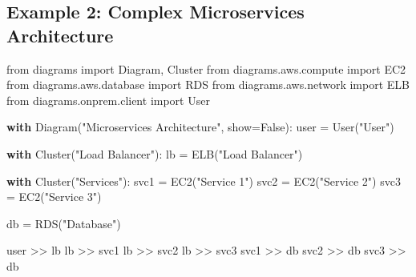 \documentclass[
  letterpaper,
  DIV=11,
  numbers=noendperiod]{scrreprt}
\newenvironment{Shaded}{\begin{snugshade}}{\end{snugshade}}
\newcommand{\ControlFlowTok}[1]{\textcolor[rgb]{0.00,0.23,0.31}{\textbf{#1}}}
\newcommand{\ImportTok}[1]{\textcolor[rgb]{0.00,0.46,0.62}{#1}}
\newcommand{\NormalTok}[1]{\textcolor[rgb]{0.00,0.23,0.31}{#1}}
\newcommand{\OperatorTok}[1]{\textcolor[rgb]{0.37,0.37,0.37}{#1}}
\newcommand{\StringTok}[1]{\textcolor[rgb]{0.13,0.47,0.30}{#1}}
\newcommand{\VariableTok}[1]{\textcolor[rgb]{0.07,0.07,0.07}{#1}}
\begin{document}
\subsection{Example 2: Complex Microservices
Architecture}\label{example-2-complex-microservices-architecture}

\begin{Shaded}
\begin{Highlighting}[]
\ImportTok{from}\NormalTok{ diagrams }\ImportTok{import}\NormalTok{ Diagram, Cluster}
\ImportTok{from}\NormalTok{ diagrams.aws.compute }\ImportTok{import}\NormalTok{ EC2}
\ImportTok{from}\NormalTok{ diagrams.aws.database }\ImportTok{import}\NormalTok{ RDS}
\ImportTok{from}\NormalTok{ diagrams.aws.network }\ImportTok{import}\NormalTok{ ELB}
\ImportTok{from}\NormalTok{ diagrams.onprem.client }\ImportTok{import}\NormalTok{ User}

\ControlFlowTok{with}\NormalTok{ Diagram(}\StringTok{"Microservices Architecture"}\NormalTok{, show}\OperatorTok{=}\VariableTok{False}\NormalTok{):}
\NormalTok{    user }\OperatorTok{=}\NormalTok{ User(}\StringTok{"User"}\NormalTok{)}
    
    \ControlFlowTok{with}\NormalTok{ Cluster(}\StringTok{"Load Balancer"}\NormalTok{):}
\NormalTok{        lb }\OperatorTok{=}\NormalTok{ ELB(}\StringTok{"Load Balancer"}\NormalTok{)}
        
    \ControlFlowTok{with}\NormalTok{ Cluster(}\StringTok{"Services"}\NormalTok{):}
\NormalTok{        svc1 }\OperatorTok{=}\NormalTok{ EC2(}\StringTok{"Service 1"}\NormalTok{)}
\NormalTok{        svc2 }\OperatorTok{=}\NormalTok{ EC2(}\StringTok{"Service 2"}\NormalTok{)}
\NormalTok{        svc3 }\OperatorTok{=}\NormalTok{ EC2(}\StringTok{"Service 3"}\NormalTok{)}
    
\NormalTok{    db }\OperatorTok{=}\NormalTok{ RDS(}\StringTok{"Database"}\NormalTok{)}
    
\NormalTok{    user }\OperatorTok{\textgreater{}\textgreater{}}\NormalTok{ lb}
\NormalTok{    lb }\OperatorTok{\textgreater{}\textgreater{}}\NormalTok{ svc1}
\NormalTok{    lb }\OperatorTok{\textgreater{}\textgreater{}}\NormalTok{ svc2}
\NormalTok{    lb }\OperatorTok{\textgreater{}\textgreater{}}\NormalTok{ svc3}
\NormalTok{    svc1 }\OperatorTok{\textgreater{}\textgreater{}}\NormalTok{ db}
\NormalTok{    svc2 }\OperatorTok{\textgreater{}\textgreater{}}\NormalTok{ db}
\NormalTok{    svc3 }\OperatorTok{\textgreater{}\textgreater{}}\NormalTok{ db}
\end{Highlighting}
\end{Shaded}
\end{document}
